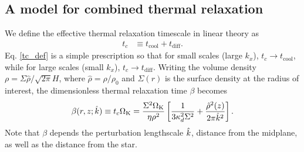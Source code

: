 \subsection{A model for combined thermal relaxation}\label{toy_relax}
We define the effective thermal relaxation timescale in linear theory as
\begin{align}\label{tc_def}
  t_c &\equiv t_\mathrm{cool} + t _\mathrm{diff}. %
\end{align}
Eq. \ref{tc_def} is a simple prescription so
that for small scales (large $k_x$), $t_c\to t_\mathrm{cool}$, while
for large scales (small $k_x$), $t_c\to t_\mathrm{diff}$. Writing the
volume density $\rho = \Sigma\hat{\rho}/\sqrt{2\pi}H$, where
$\hat{\rho} = \rho/\rho_0$ and $\Sigma(r)$ is the surface density at the
radius of interest, the dimensionless thermal
relaxation time $\beta$ becomes 
\begin{align}\label{real_beta}
  \beta(r,z;\hat{k}) \equiv t_c\Omega_{\rm K} =
  \frac{\Sigma^2\Omega_{\rm K}}{\eta\rho^2}\left[\frac{1}{3\kappa_d^2\Sigma^2} 
    + \frac{\hat{\rho}^2(z)}{2\pi \hat{k}^2}\right].
\end{align}
Note that $\beta$ depends the perturbation lengthscale $\hat{k}$,
distance from the midplane, as well as the distance from the star.  

